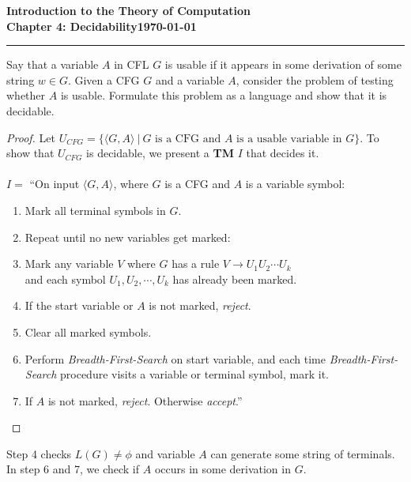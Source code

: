 \documentclass[11pt]{article}
\newcommand{\dated}{\today}
\begin{document}
\textbf{Introduction to the Theory of
Computation}\hfill\textbf{\myname}\\[0.01in]
\textbf{Chapter 4: Decidability}\hfill\textbf{\dated}\\
\smallskip\hrule\bigskip

\begin{problem}{4.31}
Say that a variable $A$ in CFL $G$ is usable if it appears in some derivation of some string $w \in G$. Given a CFG $G$ and a variable $A$, consider the problem of testing whether $A$ is usable. Formulate this problem as a language and show that it is decidable.
\end{problem}

\begin{proof}
Let $U_{CFG} = \{\langle G, A \rangle \ | \ G \text{ is a CFG and } A \text{ is a usable variable in } G \}$. To show that $U_{CFG}$ is decidable, we present a \textbf{TM} $I$ that decides it.  \\
\\
$I =$ \textquotedblleft On input $\langle G, A \rangle$, where $G$ is a CFG and $A$ is a variable symbol:
\begin{enumerate}
\item Mark all terminal symbols in $G$.
\item Repeat until no new variables get marked:
\item \hspace*{0.5cm} Mark any variable $V$ where $G$ has a rule $V \longrightarrow U_1U_2 \cdots U_k$ \\ \hspace*{0.5cm} and each symbol $U_1, U_2, \cdots, U_k$ has already been marked.
\item If the start variable or $A$ is not marked, \textit{reject}.
\item Clear all marked symbols.
\item Perform \textit{Breadth-First-Search} on start variable, and each time \textit{Breadth-First-Search} procedure visits a variable or terminal symbol, mark it.
\item If $A$ is not marked, \textit{reject}. Otherwise \textit{accept}.\textquotedblright
\end{enumerate}
\end{proof}
Step 4 checks $L(G) \neq \phi$ and variable $A$ can generate some string of terminals. In step 6 and 7, we check if $A$ occurs in some derivation in $G$.
\end{document}
